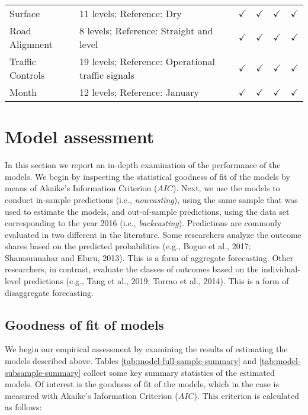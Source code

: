 \documentclass[]{elsarticle} %
\begin{document}
\begin{table}
{\begin{tabular}[t]{llllll}
\hspace{1em}Surface & 11 levels; Reference: Dry & $\checkmark$ & $\checkmark$ & $\checkmark$ & $\checkmark$\\
\rowcolor{gray!6}  \hspace{1em}Road Alignment & 8 levels; Reference: Straight and level & $\checkmark$ & $\checkmark$ & $\checkmark$ & $\checkmark$\\
\hspace{1em}Traffic Controls & 19 levels; Reference: Operational traffic signals & $\checkmark$ & $\checkmark$ & $\checkmark$ & $\checkmark$\\
\rowcolor{gray!6}  \hspace{1em}Month & 12 levels; Reference: January & $\checkmark$ & $\checkmark$ & $\checkmark$ & $\checkmark$\\
\bottomrule
\end{tabular}}
\end{table}

\hypertarget{sec:assessment}{%
\section{Model assessment}\label{sec:assessment}}

In this section we report an in-depth examination of the performance of
the models. We begin by inspecting the statistical goodness of fit of
the models by means of Akaike's Information Criterion (\(AIC\)). Next,
we use the models to conduct in-sample predictions (i.e.,
\emph{nowcasting}), using the same sample that was used to estimate the
models, and out-of-sample predictions, using the data set corresponding
to the year 2016 (i.e., \emph{backcasting}). Predictions are commonly
evaluated in two different in the literature. Some researchers analyze
the outcome shares based on the predicted probabilities (e.g., Bogue et
al., 2017; Shamsunnahar and Eluru, 2013). This is a form of aggregate
forecasting. Other researchers, in contrast, evaluate the classes of
outcomes based on the individual-level predictions (e.g., Tang et al.,
2019; Torrao et al., 2014). This is a form of disaggregate forecasting.

\hypertarget{sec:goodness-of-fit}{%
\subsection{Goodness of fit of models}\label{sec:goodness-of-fit}}

We begin our empirical assessment by examining the results of estimating
the models described above. Tables \ref{tab:model-full-sample-summary}
and \ref{tab:model-subsample-summary} collect some key summary
statistics of the estimated models. Of interest is the goodness of fit
of the models, which in the case is measured with Akaike's Information
Criterion (\(AIC\)). This criterion is calculated as follows:
\end{document}
